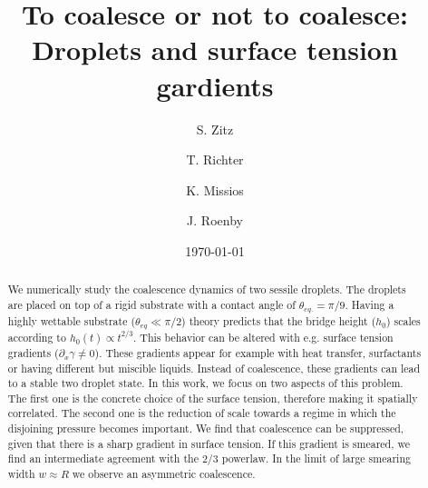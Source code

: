 \documentclass[twocolumn,amsmath,amssymb,showpacs,pre,nofootinbib,superscriptaddress]{revtex4-1} %
\begin{document}

\title{To coalesce or not to coalesce: Droplets and surface tension gardients}

\author{S. Zitz}
 \author{T. Richter}%
 \author{K. Missios}%
 \author{J. Roenby}%
\date{\today}

\begin{abstract}
We numerically study the coalescence dynamics of two sessile droplets.
The droplets are placed on top of a rigid substrate with a contact angle of $\theta_{eq.} = \pi/9$. 
Having a highly wettable substrate ($\theta_{eq} \ll \pi/2$) theory predicts that the bridge height ($h_0$) scales according to $h_0(t) \propto t^{2/3}.$
This behavior can be altered with e.g. surface tension gradients ($\partial_x\gamma \neq 0$). 
These gradients appear for example with heat transfer, surfactants or having different but miscible liquids.
Instead of coalescence, these gradients can lead to a stable two droplet state. 
In this work, we focus on two aspects of this problem.
The first one is the concrete choice of the surface tension, therefore making it spatially correlated.
The second one is the reduction of scale towards a regime in which the disjoining pressure becomes important. 
We find that coalescence can be suppressed, given that there is a sharp gradient in surface tension.
If this gradient is smeared, we find an intermediate agreement with the $2/3$ powerlaw.
In the limit of large smearing width $w \approx R$ we observe an asymmetric coalescence.
\end{abstract}
\end{document}
